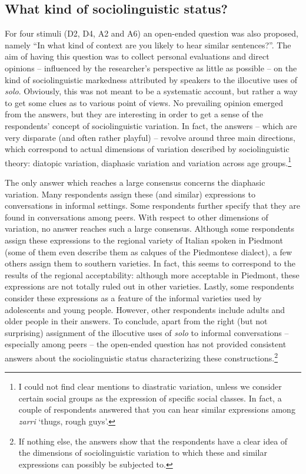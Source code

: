 \subsection{What kind of sociolinguistic status?}
\hypertarget{Toc124860675}{}
For four stimuli (D2, D4, A2 and A6) an open-ended question was also proposed, namely “In what kind of context are you likely to hear similar sentences?”. The aim of having this question was to collect personal evaluations and direct opinions – influenced by the researcher’s perspective as little as possible – on the kind of sociolinguistic markedness attributed by speakers to the illocutive uses of \textit{solo}. Obviously, this was not meant to be a systematic account, but rather a way to get some clues as to various point of views. No prevailing opinion emerged from the answers, but they are interesting in order to get a sense of the respondents’ concept of sociolinguistic variation. In fact, the answers – which are very disparate (and often rather playful) – revolve around three main directions, which correspond to actual dimensions of variation described by sociolinguistic theory: diatopic variation, diaphasic variation and variation across age groups.\footnote{I could not find clear mentions to diastratic variation, unless we consider certain social groups as the expression of specific social classes. In fact, a couple of respondents answered that you can hear similar expressions among \textit{zarri} ‘thugs, rough guys’.}

The only answer which reaches a large consensus concerns the diaphasic variation. Many respondents assign these (and similar) expressions to conversations in informal settings. Some respondents further specify that they are found in conversations among peers. With respect to other dimensions of variation, no answer reaches such a large consensus. Although some respondents assign these expressions to the regional variety of Italian spoken in Piedmont (some of them even describe them as calques of the Piedmontese dialect), a few others assign them to southern varieties. In fact, this seems to correspond to the results of the regional acceptability: although more acceptable in Piedmont, these expressions are not totally ruled out in other varieties. Lastly, some respondents consider these expressions as a feature of the informal varieties used by adolescents and young people. However, other respondents include adults and older people in their answers. To conclude, apart from the right (but not surprising) assignment of the illocutive uses of \textit{solo} to informal conversations – especially among peers – the open-ended question has not provided consistent answers about the sociolinguistic status characterizing these constructions.\footnote{If nothing else, the answers show that the respondents have a clear idea of the dimensions of sociolinguistic variation to which these and similar expressions can possibly be subjected to.}\clearpage


